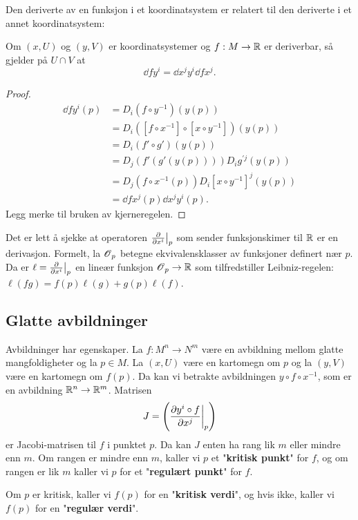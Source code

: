 \documentclass[11pt, english]{article}
\begin{document}
Den deriverte av en funksjon i et koordinatsystem er relatert til den deriverte i et annet koordinatsystem:
\begin{prop}
Om $(x,U)$ og $(y,V)$ er koordinatsystemer og $f: M \to \mathbb{R}$ er deriverbar, så gjelder på $U \cap V$ at
$$
\dd{f}{y^i} = \dd{x^j}{y^i} \dd{f}{x^j}.
$$
\end{prop}
\begin{proof}
\begin{align*}
\dd{f}{y^i}(p) &= D_i(f \circ y^{-1})(y(p)) \\
&= D_i([f \circ x^{-1}] \circ[ x \circ y^{-1}] )(y(p)) \\
&= D_i(f' \circ g')(y(p)) \\
&= D_j(f'(g'(y(p)))) D_i g^{'j}(y(p)) \\
&= D_j(f \circ x^{-1}(p)) D_i [x \circ y^{-1}]^j (y(p)) \\
&= \dd{f}{x^j}(p)  \dd{x^j}{y^i}(p).
\end{align*}
Legg merke til bruken av kjerneregelen.
\end{proof}

\begin{remark}
Det er lett å sjekke at operatoren $\restr{\dd{}{x^i}}{p}$ som sender funksjonskimer til $\mathbb{R}$ er en derivasjon. Formelt, la $\operatorname{\mathscr{O}}_p$ betegne ekvivalensklasser av funksjoner definert nær $p$. Da er $\ell=\restr{\dd{}{x^i}}{p}$ en lineær funksjon $\operatorname{\mathscr{O}}_p \to \mathbb{R}$ som tilfredstiller Leibniz-regelen: $\ell(fg) = f(p)\ell(g) + g(p) \ell(f)$.
\end{remark}

\subsection{Glatte avbildninger}

Avbildninger har egenskaper. La $f:M^n \to N^m$ være en avbildning mellom glatte mangfoldigheter og la $p \in M$. La $(x,U)$ være en kartomegn om $p$ og la $(y,V)$ være en kartomegn om $f(p)$. Da kan vi betrakte avbildningen $y \circ f \circ x^{-1}$, som er en avbildning $\mathbb{R}^n \to \mathbb{R}^m$. Matrisen
$$
J = \left( \restr{\dd{y^i \circ f}{x^j}}{p} \right)
$$
er Jacobi-matrisen til $f$ i punktet $p$. Da kan $J$ enten ha rang lik $m$ eller mindre enn $m$. Om rangen er mindre enn $m$, kaller vi $p$ et "\textbf{kritisk punkt}" for $f$, og om rangen er lik $m$ kaller vi $p$ for et "\textbf{regulært punkt}" for $f$. 

Om $p$ er kritisk, kaller vi $f(p)$ for en "\textbf{kritisk verdi}", og hvis ikke, kaller vi $f(p)$ for en "\textbf{regulær verdi}". 
\end{document}
